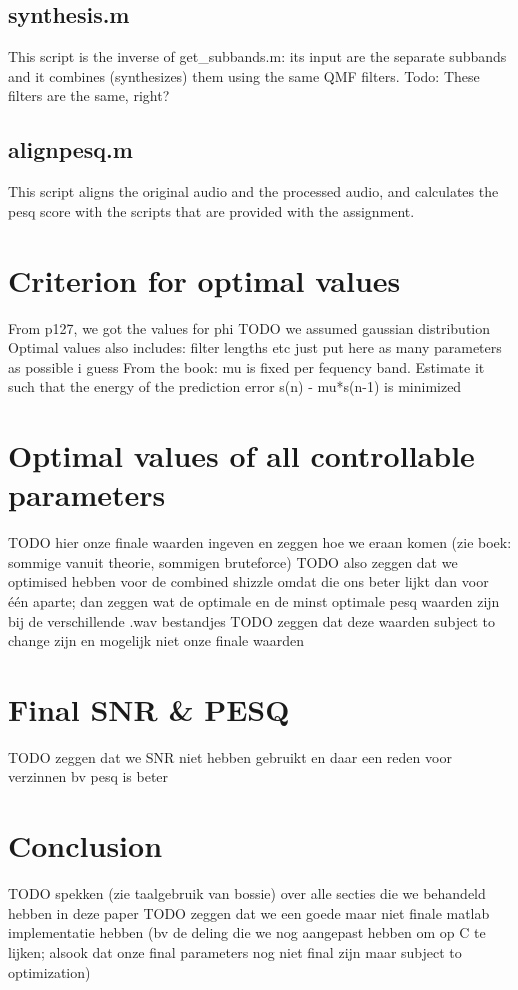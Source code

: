 \documentclass[a4paper]{article}
\begin{document}
\subsection{synthesis.m}
This script is the inverse of get\_subbands.m: its input are the separate subbands and it combines (synthesizes) them using the same QMF filters. Todo: These filters are the same, right?

\subsection{alignpesq.m}
This script aligns the original audio and the processed audio, and calculates the pesq score with the scripts that are provided with the assignment.

\section{Criterion for optimal values}
From p127, we got the values for phi TODO we assumed gaussian distribution
Optimal values also includes: filter lengths etc just put here as many parameters as possible i guess
From the book: mu is fixed per fequency band. Estimate it such that the energy of the prediction error s(n) - mu*s(n-1) is minimized

\section{Optimal values of all controllable parameters}
TODO hier onze finale waarden ingeven en zeggen hoe we eraan komen (zie boek: sommige vanuit theorie, sommigen bruteforce)
TODO also zeggen dat we optimised hebben voor de combined shizzle omdat die ons beter lijkt dan voor één aparte; dan zeggen wat de optimale en de minst optimale pesq waarden zijn bij de verschillende .wav bestandjes
TODO zeggen dat deze waarden subject to change zijn en mogelijk niet onze finale waarden

\section{Final SNR \& PESQ}
TODO zeggen dat we SNR niet hebben gebruikt en daar een reden voor verzinnen bv pesq is beter

\section{Conclusion}
TODO spekken (zie taalgebruik van bossie) over alle secties die we behandeld hebben in deze paper
TODO zeggen dat we een goede maar niet finale matlab implementatie hebben (bv de deling die we nog aangepast hebben om op C te lijken; alsook dat onze final parameters nog niet final zijn maar subject to optimization)
\end{document}
